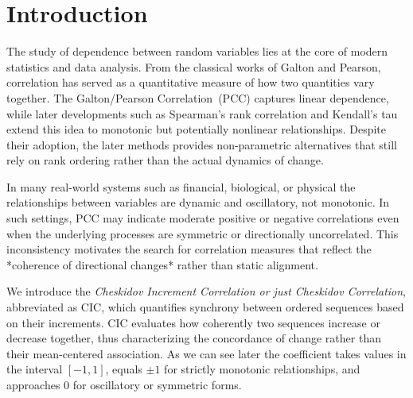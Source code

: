 \documentclass[qe,nameyear,draft]{econsocart}
\newcommand{\cic}{\text{CIC}}
\newcommand{\cicFull}{\textnormal{Cheskidov Correlation}}
\newcommand{\pcc}{\text{PCC}}
\newcommand{\pccFull}{\textnormal{Galton/Pearson Correlation}}
\begin{document}
\begin{frontmatter}
\begin{keyword}[class=JEL] %
\end{keyword}

\end{frontmatter}



\section{Introduction}
The study of dependence between random variables lies at the core of modern statistics and data analysis. From the classical works of Galton and Pearson, correlation has served as a quantitative measure of how two quantities vary together. The \pccFull\ ($\pcc$) captures linear dependence, while later developments such as Spearman’s rank correlation and Kendall’s tau extend this idea to monotonic but potentially nonlinear relationships. Despite their adoption, the later methods provides non-parametric alternatives that still rely on rank ordering rather than the actual dynamics of change.

In many real-world systems such as financial, biological, or physical the relationships between variables are dynamic and oscillatory, not monotonic. In such settings, $\pcc$ may indicate moderate positive or negative correlations even when the underlying processes are symmetric or directionally uncorrelated. This inconsistency motivates the search for correlation measures that reflect the *coherence of directional changes* rather than static alignment.

We introduce the \textit{Cheskidov Increment Correlation or just \cicFull}, abbreviated as $\cic$, which quantifies synchrony between ordered sequences based on their increments. $\cic$ evaluates how coherently two sequences increase or decrease together, thus characterizing the concordance of change rather than their mean-centered association. As we can see later the coefficient takes values in the interval $[-1, 1]$, equals $\pm 1$ for strictly monotonic relationships, and approaches $0$ for oscillatory or symmetric forms.
\end{document}
